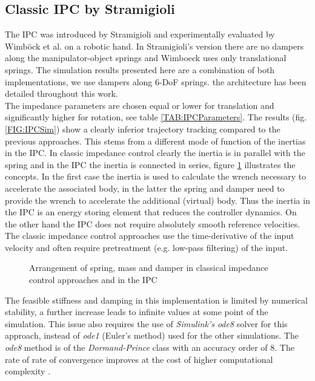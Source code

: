\documentclass[a4paper,twoside, openright,12pt]{report}
\begin{document}
\subsection{Classic IPC by Stramigioli}
The IPC was introduced by Stramigioli \cite{Stramigioli_01} and experimentally evaluated by Wimb\"ock et al. \cite{Wimboeck_08} on a robotic hand. In Stramigioli's version there are no dampers along the manipulator-object springs and Wimboeck uses only translational springs. The simulation results presented here are a combination of both implementations, we use dampers along 6-DoF springs. the architecture has been detailed throughout this work.\\
The impedance parameters are chosen equal or lower for translation and significantly higher for rotation, see table \ref{TAB:IPCParameters}. The results (fig. \ref{FIG:IPCSim}) show a clearly inferior trajectory tracking compared to the previous approaches. This stems from a different mode of function of the inertias in the IPC. In classic impedance control clearly the inertia is in parallel with the spring and in the IPC the inertia is connected in series, figure \ref{FIG:ImpedanceIPC} illustrates the concepts. In the first case the inertia is used to calculate the wrench necessary to accelerate the associated body, in the latter the spring and damper need to provide the wrench to accelerate the additional (virtual) body. Thus the inertia in the IPC is an energy storing element that reduces the controller dynamics. On the other hand the IPC does not require absolutely smooth reference velocities. The classic impedance control approaches use the time-derivative of the input velocity and often require pretreatment (e.g. low-pass filtering) of the input.\\
\begin{figure}[H]
	\centering
	\small
	\def\svgwidth{0.95\columnwidth}
	
	\caption{Arrangement of spring, mass and damper in classical impedance control approaches and in the IPC }
	\label{FIG:ImpedanceIPC}
\end{figure}
The feasible stiffness and damping in this implementation is limited by numerical stability, a further increase leads to infinite values at some point of the simulation. This issue also requires the use of \emph{Simulink's ode8} solver for this approach, instead of \emph{ode1} (Euler's method) used for the other simulations. The \emph{ode8} method is of the \emph{Dormand-Prince} class with an accuracy order of $8$. The rate of rate of convergence improves at the cost of higher computational complexity \cite{SimulinkHelp:Solver}. 
\end{document}
